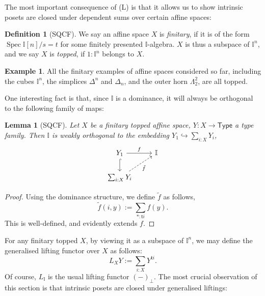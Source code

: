 \documentclass[12pt]{amsart}
\newtheorem{lemma}[theorem]{Lemma}
\theoremstyle{definition}
\newtheorem{example}[theorem]{Example}
\newtheorem{definition}[theorem]{Definition}
\newcommand{\mbb}[1]{\mathbb{#1}}
\newcommand{\I}{\mbb I}
\newcommand{\ms}[1]{\mathsf{#1}}
\newcommand{\qsi}[1]{\tilde{#1}}
\newcommand{\hook}{\hookrightarrow}
\newcommand{\prt}{_{\bot}}
\newcommand{\tp}{\ms{Type}}
\newcommand{\spec}{\operatorname{Spec}}
\begin{document}
The most important consequence of (L) is that it allows us to show intrinsic posets are closed under dependent sums over certain affine spaces:

\begin{definition}[SQCF]
  We say an affine space $X$ is \emph{finitary}, if it is of the form $\spec\I[n]/s=t$ for some finitely presented $\I$-algebra. $X$ is thus a subspace of $\I^n$, and we say $X$ is \emph{topped}, if $1 : \I^n$ belongs to $X$.
\end{definition}

\begin{example}
  All the finitary examples of affine spaces considered so far, including the cubes $\I^n$, the simplices $\Delta^n$ and $\Delta_n$, and the outer horn $\Lambda^2_2$, are all topped.
\end{example}

One interesting fact is that, since $\I$ is a dominance, it will always be orthogonal to the following family of maps:

\begin{lemma}[SQCF]\label{lem:toppedfamilyortho}
  Let $X$ be a finitary topped affine space, $Y : X \to \tp$ a type family. Then $\I$ is weakly orthogonal to the embedding $Y_1 \hook \sum_{i : X}Y_i$,
  \[
  \begin{tikzcd}
    Y_1 \ar[d, hook] \ar[r, "f"] & \I \\ 
    \sum_{i : X} Y_i \ar[ur, dashed, "\qsi f"']
  \end{tikzcd}
  \]
\end{lemma}
\begin{proof}
  Using the dominance structure, we define $\qsi f$ as follows,
  \[ \qsi f(i,y) := \sum_{*:\ms ti} f(y). \]
  This is well-defined, and evidently extends $f$.
\end{proof}

For any finitary topped $X$, by viewing it as a subspace of $\I^n$, we may define the generalised lifting functor over $X$ as follows:
\[ L_XY := \sum_{i:X}Y^{\ms ti}. \]
Of course, $L_\I$ is the usual lifting functor $(-)\prt$. The most crucial observation of this section is that intrinsic posets are closed under generalised liftings:
\end{document}
